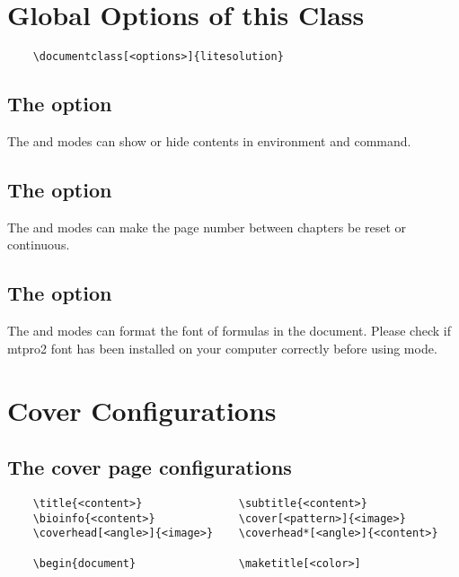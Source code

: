 \documentclass[ans,mtpro2]{litesolution}
\begin{document}
\section{Global Options of this Class}

\begin{verbatim}
    \documentclass[<options>]{litesolution}
\end{verbatim}

\subsection{The  option}

The  and  modes can show or hide contents in  environment and  command.

\subsection{The  option}

The  and  modes can make the page number between chapters be reset or continuous.

\subsection{The  option}

The  and  modes can format the font of formulas in the document. Please check if mtpro2 font has been installed on your computer correctly before using  mode.

\section{Cover Configurations}

\subsection{The cover page configurations}

\begin{verbatim}
    \title{<content>}               \subtitle{<content>}
    \bioinfo{<content>}             \cover[<pattern>]{<image>}
    \coverhead[<angle>]{<image>}    \coverhead*[<angle>]{<content>}

    \begin{document}                \maketitle[<color>]
\end{verbatim}
\end{document}
